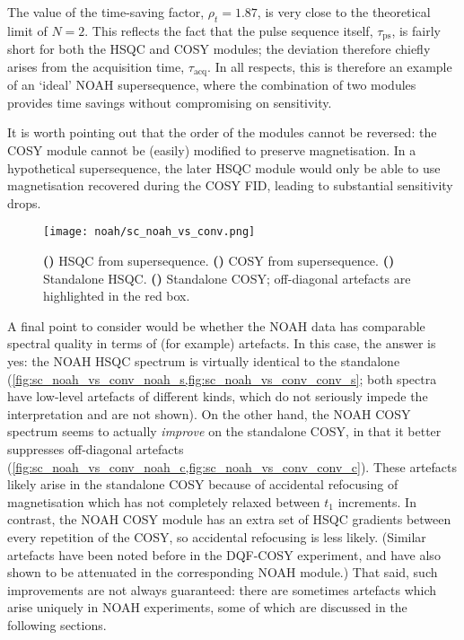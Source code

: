 The value of the time-saving factor, $\rho_t = 1.87$, is very close to the theoretical limit of $N = 2$.
This reflects the fact that the pulse sequence itself, $\tau_\text{ps}$, is fairly short for both the HSQC and COSY modules; the deviation therefore chiefly arises from the acquisition time, $\tau_\text{acq}$.
In all respects, this is therefore an example of an `ideal' NOAH supersequence, where the combination of two modules provides time savings without compromising on sensitivity.

It is worth pointing out that the order of the modules cannot be reversed: the COSY module cannot be (easily) modified to preserve  magnetisation.
In a hypothetical  supersequence, the later HSQC module would only be able to use magnetisation recovered during the COSY FID, leading to substantial sensitivity drops.

\begin{figure}[!ht]
    \centering
    \texttt{[image: noah/sc\_noah\_vs\_conv.png]}%
    {\label{fig:sc_noah_vs_conv_noah_s}}%
    {\label{fig:sc_noah_vs_conv_noah_c}}%
    {\label{fig:sc_noah_vs_conv_conv_s}}%
    {\label{fig:sc_noah_vs_conv_conv_c}}%
    \caption[Comparison of spectra obtained from  and standalone experiments]{
        \textbf{()} HSQC from  supersequence.
        \textbf{()} COSY from  supersequence.
        \textbf{()} Standalone HSQC.
        \textbf{()} Standalone COSY; off-diagonal artefacts are highlighted in the red box.
    }
    \label{fig:sc_noah_vs_conv}
\end{figure}

A final point to consider would be whether the NOAH data has comparable spectral quality in terms of (for example) artefacts.
In this case, the answer is yes: the NOAH HSQC spectrum is virtually identical to the standalone (\cref{fig:sc_noah_vs_conv_noah_s,fig:sc_noah_vs_conv_conv_s}; both spectra have low-level artefacts of different kinds, which do not seriously impede the interpretation and are not shown).
On the other hand, the NOAH COSY spectrum seems to actually \textit{improve} on the standalone COSY, in that it better suppresses off-diagonal artefacts (\cref{fig:sc_noah_vs_conv_noah_c,fig:sc_noah_vs_conv_conv_c}).
These artefacts likely arise in the standalone COSY because of accidental refocusing of magnetisation which has not completely relaxed between $t_1$ increments.\autocite{Vitorge2010JMR}
In contrast, the NOAH COSY module has an extra set of HSQC gradients between every repetition of the COSY, so accidental refocusing is less likely.
(Similar artefacts have been noted before in the DQF-COSY experiment\autocite{Shaw1996JMRSA,Howe2014MRC}, and have also shown to be attenuated in the corresponding NOAH module\autocite{Claridge2019MRC}.)
That said, such improvements are not always guaranteed: there are sometimes artefacts which arise uniquely in NOAH experiments, some of which are discussed in the following sections.


